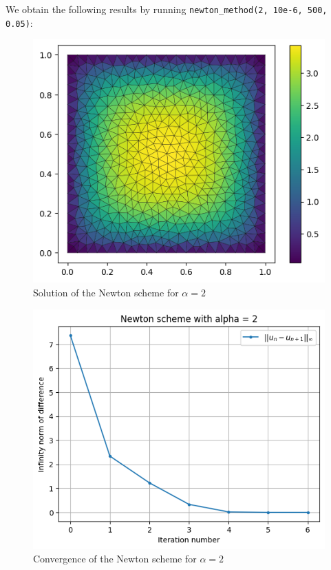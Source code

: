 \documentclass[11pt, a4paper, twoside]{article}
\begin{document}
We obtain the following results by running \verb+newton_method(2, 10e-6, 500, 0.05)+:

\begin{figure}[H]
\centering
\includegraphics[scale = 0.7]{../Figures/newt_sol_alpha2.png}
\caption{Solution of the Newton scheme for $\alpha=2$}
\label{q3fig3}
\end{figure}

\begin{figure}[H]
\centering
\includegraphics[scale = 0.7]{../Figures/newt_conv_alpha2.png}
\caption{Convergence of the Newton scheme for $\alpha=2$}
\label{q3fig4}
\end{figure}
\end{document}
